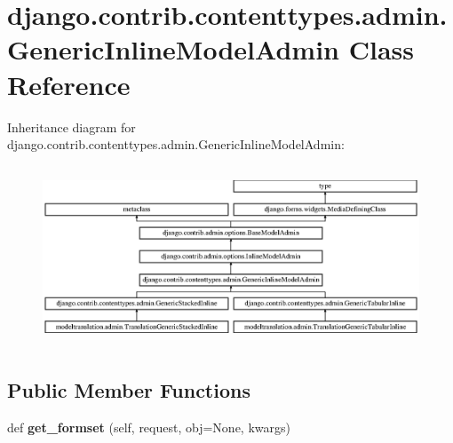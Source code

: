 \hypertarget{classdjango_1_1contrib_1_1contenttypes_1_1admin_1_1_generic_inline_model_admin}{}\section{django.\+contrib.\+contenttypes.\+admin.\+Generic\+Inline\+Model\+Admin Class Reference}
\label{classdjango_1_1contrib_1_1contenttypes_1_1admin_1_1_generic_inline_model_admin}
Inheritance diagram for django.\+contrib.\+contenttypes.\+admin.\+Generic\+Inline\+Model\+Admin\+:\begin{figure}[H]
\begin{center}
\leavevmode
\includegraphics[height=5.414365cm]{classdjango_1_1contrib_1_1contenttypes_1_1admin_1_1_generic_inline_model_admin}
\end{center}
\end{figure}
\subsection*{Public Member Functions}
\begin{DoxyCompactItemize}
\item 
\mbox{\label{classdjango_1_1contrib_1_1contenttypes_1_1admin_1_1_generic_inline_model_admin_a6f123f9b6c91ec98c9cd674c937f1005}} 
def {\bfseries get\+\_\+formset} (self, request, obj=None, kwargs)
\end{DoxyCompactItemize}
